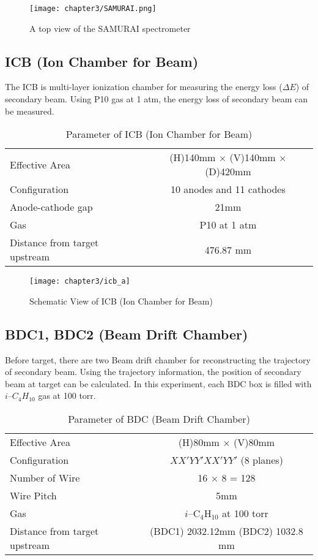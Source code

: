 \begin{figure}[t]
    \centering
    \texttt{[image: chapter3/SAMURAI.png]}
    \caption{A top view of the SAMURAI spectrometer}
\end{figure}


\subsection{ICB (Ion Chamber for Beam)}
The ICB is multi-layer ionization chamber for measuring the energy loss ($\Delta E$) of secondary beam. Using P10 gas at 1 atm, the energy loss of secondary beam can be measured. 
\begin{table}[h]
    \centering
    \begin{tabular}{l|c}
        \hline
        Effective Area & (H)140mm $\times$ (V)140mm $\times$ (D)420mm\\
        Configuration & 10 anodes and 11 cathodes \\
        Anode-cathode gap & 21mm \\
        Gas & P10 at 1 atm\\
        Distance from target upstream & 476.87 mm \\
        \hline
    \end{tabular}
    \caption{Parameter of ICB (Ion Chamber for Beam) \cite{SAMURAI}}
\end{table}

\begin{figure}[t]
    \centering
    \texttt{[image: chapter3/icb\_a]}
    \caption{Schematic View of ICB (Ion Chamber for Beam) \cite{SAMURAI}}
\end{figure}

\subsection{BDC1, BDC2 (Beam Drift Chamber)}
Before target, there are two Beam drift chamber for reconstructing the trajectory of secondary beam. Using the trajectory information, the position of secondary beam at target can be calculated. In this experiment, each BDC box is filled with $i$--${C}_{4} {H}_{10}$ gas at 100 torr. 

\begin{table}[h]
    \centering
    \begin{tabular}[h]{l|c}
        \hline
        Effective Area & (H)80mm $\times$ (V)80mm\\
        Configuration & $XX'YY'XX'YY'$ (8 planes)\\
        Number of Wire & 16 $\times$ 8 = 128 \\
        Wire Pitch & 5mm \\
        Gas & $i$--${\text{C}}_{4} {\text{H}}_{10}$ at 100 torr\\
        Distance from target upstream & (BDC1) 2032.12mm (BDC2) 1032.8 mm \\
        \hline
    \end{tabular}
    \caption{Parameter of BDC (Beam Drift Chamber) \cite{SAMURAI}}
\end{table}

